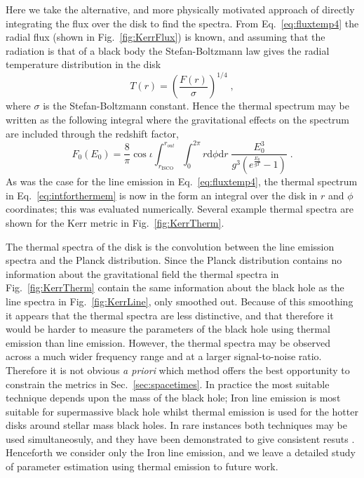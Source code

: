 Here we take the alternative, and more physically motivated approach of directly integrating the flux over the disk to find the spectra. From Eq.\ \ref{eq:fluxtemp4} the radial flux (shown in Fig.\ \ref{fig:KerrFlux}) is known, and assuming that the radiation is that of a black body the Stefan-Boltzmann law gives the radial temperature distribution in the disk
\begin{equation} T(r)=\left( \frac{F(r)}{\sigma} \right)^{1/4} \; ,\end{equation}
where $\sigma$ is the Stefan-Boltzmann constant. Hence the thermal spectrum may be written as the following integral where the gravitational effects on the spectrum are included through the redshift factor,
\begin{equation}\label{eq:intforthermem}F_{0}(E_{0})=\frac{8}{\pi}\cos \iota\int_{r_{\textrm{ISCO}}}^{r_{out}}\int_{0}^{2\pi}r\textrm{d}\phi\textrm{d}r\;\frac{E_{0}^{3}}{g^{3}\left(e^{\frac{E_{0}}{gT}}-1\right)}\; .\end{equation}
As was the case for the line emission in Eq.\ \ref{eq:fluxtemp4}, the thermal spectrum in Eq.\ \ref{eq:intforthermem} is now in the form an integral over the disk in $r$ and $\phi$ coordinates; this was evaluated numerically. Several example thermal spectra are shown for the Kerr metric in Fig.\ \ref{fig:KerrTherm}.

The thermal spectra of the disk is the convolution between the line emission spectra and the Planck distribution. Since the Planck distribution contains no information about the gravitational field the thermal spectra in Fig.\ \ref{fig:KerrTherm} contain the same information about the black hole as the line spectra in Fig.\ \ref{fig:KerrLine}, only smoothed out. Because of this smoothing it appears that the thermal spectra are less distinctive, and that therefore it would be harder to measure the parameters of the black hole using thermal emission than line emission. However, the thermal spectra may be observed across a much wider frequency range and at a larger signal-to-noise ratio. Therefore it is not obvious \emph{a priori} which method offers the best opportunity to constrain the metrics in Sec.\ \ref{sec:spacetimes}. In practice the most suitable technique depends upon the mass of the black hole; Iron line emission is most suitable for supermassive black hole whilst thermal emission is used for the hotter disks around stellar mass black holes. In rare instances both techniques may be used simultaneosuly, and they have been demonstrated to give consistent resuts \cite{2011MNRAS.416..941S}. Henceforth we consider only the Iron line emission, and we leave a detailed study of parameter estimation using thermal emission to future work. 

